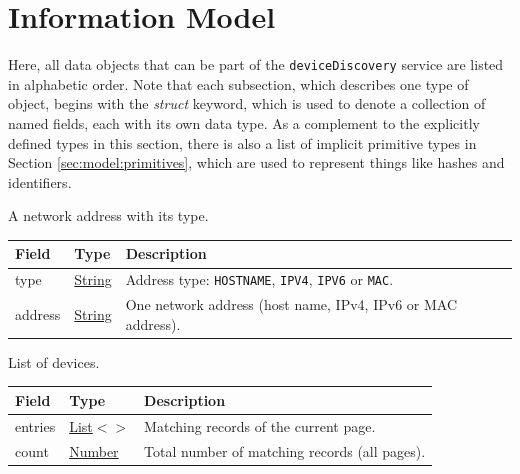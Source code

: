 \documentclass[a4paper]{arrowhead}
\newcommand{\mref}[2][]{{\textcolor{ArrowheadPurple}{\hyperref[sec:model:#2]{\ifstrempty{#1}{#2}{#1}}}}}
\newcommand{\pref}[1]{{\textcolor{ArrowheadGrey}{\hyperref[sec:model:primitives:#1]{#1}}}}
\begin{document}
\newpage

\section{Information Model}
\label{sec:model}

Here, all data objects that can be part of the \texttt{deviceDiscovery} service are listed in alphabetic order.
Note that each subsection, which describes one type of object, begins with the \textit{struct} keyword, which is used to denote a collection of named fields, each with its own data type.
As a complement to the explicitly defined types in this section, there is also a list of implicit primitive types in Section \ref{sec:model:primitives}, which are used to represent things like hashes and identifiers.


A network address with its type.


\noindent\begin{tabularx}{\textwidth}{| >{\raggedright\arraybackslash}p{3.9cm} | >{\raggedright\arraybackslash\small}p{5.3cm} | X |} \hline
\rowcolor{gray!33} Field & Type & Description \\ \hline
type & \pref{String} & Address type: \texttt{HOSTNAME}, \texttt{IPV4}, \texttt{IPV6} or \texttt{MAC}. \\ \hline
address & \pref{String} & One network address (host name, IPv4, IPv6 or MAC address). \\ \hline
\end{tabularx}




List of devices.


\noindent\begin{tabularx}{\textwidth}{| >{\raggedright\arraybackslash}p{3.9cm} | >{\raggedright\arraybackslash\small}p{5.3cm} | X |} \hline
\rowcolor{gray!33} Field & Type & Description \\ \hline
entries & \pref{List}$<$\allowbreak{}\mref{DeviceResponse}$>$ & Matching records of the current page. \\ \hline
count & \pref{Number} & Total number of matching records (all pages). \\ \hline
\end{tabularx}



\end{document}
